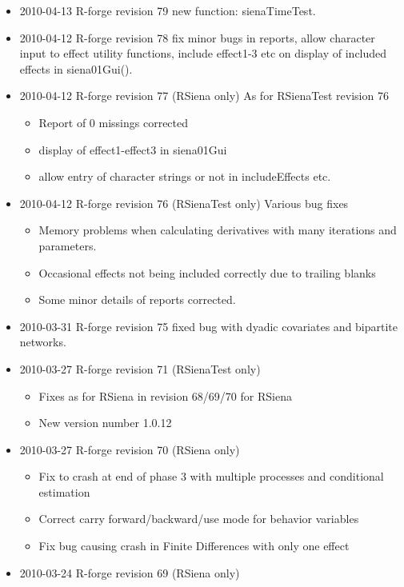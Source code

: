\documentclass[a4paper,fleqn,11pt]{article}
\newcommand{\+}{\, + \,}
\begin{document}
\begin{small}
\begin{itemize}
\item 2010-04-13 R-forge revision 79 new function: sienaTimeTest.
\item 2010-04-12 R-forge revision 78 fix minor bugs in reports, allow character
  input to effect utility functions, include effect1-3 etc on display of
  included effects in siena01Gui().
\item 2010-04-12 R-forge revision 77 (RSiena only) As for RSienaTest revision 76
\begin{itemize}
\item Report of 0 missings corrected
\item display of effect1-effect3 in siena01Gui
\item allow entry of character strings or not in includeEffects etc.
\end{itemize}
\item 2010-04-12 R-forge revision 76 (RSienaTest only) Various bug fixes
\begin{itemize}
\item Memory problems when calculating derivatives with many iterations and
  parameters.
\item Occasional effects not being included correctly due to trailing blanks
\item Some minor details of reports corrected.
\end{itemize}
\item 2010-03-31 R-forge revision 75 fixed bug with dyadic covariates and
  bipartite networks.
\item 2010-03-27 R-forge revision 71 (RSienaTest only)
\begin{itemize}
\item Fixes as for RSiena in revision 68/69/70 for RSiena
\item New version number 1.0.12
\end{itemize}
\item 2010-03-27 R-forge revision 70 (RSiena only)
\begin{itemize}
\item Fix to crash at end of phase 3 with multiple processes and
conditional estimation
\item Correct carry forward/backward/use mode for behavior variables
\item Fix bug causing crash in Finite Differences with only one effect
\end{itemize}
\item 2010-03-24 R-forge revision 69 (RSiena only)
\begin{itemize}

\end{itemize}
\end{itemize}
\end{small}
\end{document}
